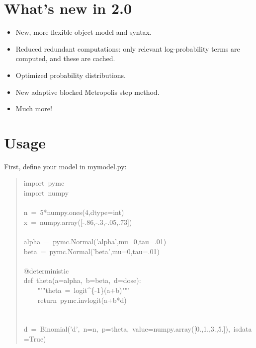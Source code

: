 
\hypertarget{what-s-new-in-2-0}{}
\section*{What's new in 2.0}
\label{what-s-new-in-2-0}
\begin{itemize}
\item {} 
New, more flexible object model and syntax.

\item {} 
Reduced redundant computations: only relevant log-probability terms are
computed, and these are cached.

\item {} 
Optimized probability distributions.

\item {} 
New adaptive blocked Metropolis step method.

\item {} 
Much more!

\end{itemize}



\hypertarget{usage}{}
\section*{Usage}
\label{usage}

First, define your model in mymodel.py:
\begin{quote}{\ttfamily \raggedright \noindent
import~pymc~\\
import~numpy~\\
~\\
n~=~5*numpy.ones(4,dtype=int)~\\
x~=~numpy.array({[}-.86,-.3,-.05,.73{]})~\\
~\\
alpha~=~pymc.Normal('alpha',mu=0,tau=.01)~\\
beta~=~pymc.Normal('beta',mu=0,tau=.01)~\\
~\\
@deterministic~\\
def~theta(a=alpha,~b=beta,~d=dose):~\\
~~~~"{}"{}"theta~=~logit{\textasciicircum}{\{}-1{\}}(a+b)"{}"{}"~\\
~~~~return~pymc.invlogit(a+b*d)~\\
~\\
~\\
d~=~Binomial('d',~n=n,~p=theta,~value=numpy.array({[}0.,1.,3.,5.{]}),~isdata=True)
}\end{quote}

